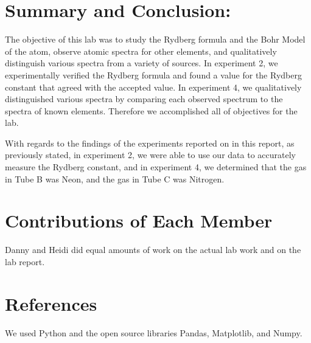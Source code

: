 \documentclass[11pt]{article}
\begin{document}
    \hypertarget{summary-and-conclusion}{%
\section{Summary and Conclusion:}\label{summary-and-conclusion}}

The objective of this lab was to study the Rydberg formula and the Bohr
Model of the atom, observe atomic spectra for other elements, and
qualitatively distinguish various spectra from a variety of sources. In
experiment 2, we experimentally verified the Rydberg formula and found a
value for the Rydberg constant that agreed with the accepted value. In
experiment 4, we qualitatively distinguished various spectra by
comparing each observed spectrum to the spectra of known elements.
Therefore we accomplished all of objectives for the lab.

With regards to the findings of the experiments reported on in this
report, as previously stated, in experiment 2, we were able to use our
data to accurately measure the Rydberg constant, and in experiment 4, we
determined that the gas in Tube B was Neon, and the gas in Tube C was
Nitrogen.

\hypertarget{contributions-of-each-member}{%
\section{Contributions of Each
Member}\label{contributions-of-each-member}}

Danny and Heidi did equal amounts of work on the actual lab work and on
the lab report.

\hypertarget{references}{%
\section{References}\label{references}}

We used Python and the open source libraries Pandas, Matplotlib, and
Numpy.
\end{document}
